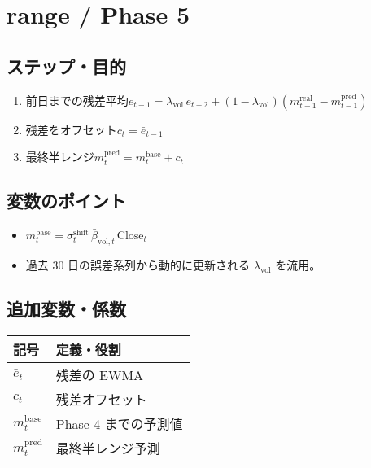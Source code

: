
\section*{range / Phase 5}\nopagebreak[4]
\subsection*{ステップ・目的}
\begin{flushleft}
\begin{enumerate}
  \item 前日までの残差平均\;\( \bar e_{t-1} = \lambda_{\mathrm{vol}}\,\bar e_{t-2}
        +(1-\lambda_{\mathrm{vol}})(m_{t-1}^{\text{real}}-m_{t-1}^{\text{pred}}) \)
  \item 残差をオフセット\;\( c_t = \bar e_{t-1} \)
  \item 最終半レンジ\;\( m_t^{\text{pred}} = m_t^{\text{base}} + c_t \)
\end{enumerate}
\end{flushleft}

\subsection*{変数のポイント}
\begin{flushleft}
\begin{itemize}
  \item \( m_t^{\text{base}}=\sigma_t^{\text{shift}}\,\bar\beta_{\text{vol},t}\,\text{Close}_t \)
  \item 過去 30 日の誤差系列から動的に更新される \( \lambda_{\mathrm{vol}} \) を流用。
\end{itemize}
\end{flushleft}

\subsection*{追加変数・係数}
\begin{flushleft}
\begin{minipage}{0.88\textwidth}
\begin{tabularx}{\textwidth}{@{}lX@{}}
\toprule
記号 & 定義・役割 \\
\midrule
\( \bar e_{t} \) & 残差の EWMA \\
\( c_t \) & 残差オフセット \\
\( m_t^{\text{base}} \) & Phase 4 までの予測値 \\
\( m_t^{\text{pred}} \) & 最終半レンジ予測 \\
\bottomrule
\end{tabularx}
\end{minipage}
\end{flushleft}
